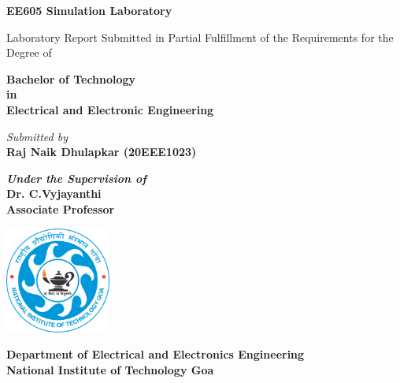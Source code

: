 \begin{titlepage}
    \begin{center}

        \huge {\textbf{EE605 Simulation Laboratory}}
        \vspace{1cm}

        {\Large Laboratory Report Submitted in Partial Fulfillment of the Requirements for the Degree of}\\
        \vspace{1cm}

        \textbf{\Large Bachelor of Technology}\\
        \textbf{\Large{in}}\\
        \textbf{\Large Electrical and Electronic Engineering}
        \vspace{1cm}

        \textit{Submitted by}\\
        \textbf{\large Raj Naik Dhulapkar  (20EEE1023)}\\
        \vspace{1cm}

        \centering \large \textbf{\textit{Under the Supervision of}}\\
        \textbf{\large Dr. C.Vyjayanthi}\\
        \centering\textbf{Associate Professor}
        \vspace{2cm}

        \includegraphics[width=0.26\textwidth]{images/NIT_Goa_Logo.png}\\
        \vspace{2cm}

        \textbf{Department of Electrical and Electronics Engineering}\\
        \vspace{0.1cm}
        \textbf{National Institute of Technology Goa}\\
        \vspace{0.3cm}
        \textbf{}

    \end{center}
\end{titlepage}